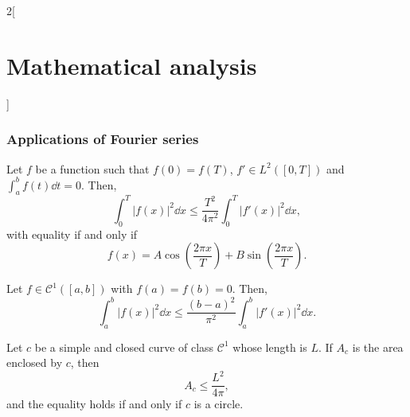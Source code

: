 \documentclass[../../../main.tex]{subfiles}
\begin{document}
\begin{multicols}{2}[\section{Mathematical analysis}]
  \subsubsection{Applications of Fourier series}
  \begin{theorem}
    Let $f$ be a function such that $f(0)=f(T)$, $f'\in L^2([0,T])$ and $\displaystyle\int_a^bf(t)\dd t=0$. Then, $$\int_0^T|f(x)|^2\dd x\leq\frac{T^2}{4\pi^2}\int_0^T|f'(x)|^2\dd x,$$ with equality if and only if $$f(x)=A\cos\left(\frac{2\pi x}{T}\right)+B\sin\left(\frac{2\pi x}{T}\right).$$
  \end{theorem}
  \begin{theorem}
    Let $f\in \mathcal{C}^1([a,b])$ with $f(a)=f(b)=0$. Then, $$\int_a^b|f(x)|^2\dd x\leq\frac{(b-a)^2}{\pi^2}\int_a^b|f'(x)|^2\dd x.$$
  \end{theorem}
  \begin{theorem}
    Let $c$ be a simple and closed curve of class $\mathcal{C}^1$ whose length is $L$. If $A_c$ is the area enclosed by $c$, then $$A_c\leq\frac{L^2}{4\pi},$$ and the equality holds if and only if $c$ is a circle.
  \end{theorem}
\end{multicols}
\end{document}
